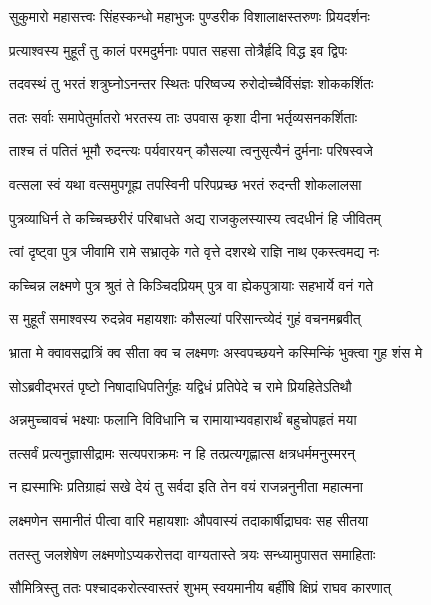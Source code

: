 \twolineshloka
{सुकुमारो महासत्त्वः सिंहस्कन्धो महाभुजः}
{पुण्डरीक विशालाक्षस्तरुणः प्रियदर्शनः} %

\twolineshloka
{प्रत्याश्वस्य मुहूर्तं तु कालं परमदुर्मनाः}
{पपात सहसा तोत्रैर्हृदि विद्ध इव द्विपः} %

\twolineshloka
{तदवस्थं तु भरतं शत्रुघ्नोऽनन्तर स्थितः}
{परिष्वज्य रुरोदोच्चैर्विसंज्ञः शोककर्शितः} %

\twolineshloka
{ततः सर्वाः समापेतुर्मातरो भरतस्य ताः}
{उपवास कृशा दीना भर्तृव्यसनकर्शिताः} %

\twolineshloka
{ताश्च तं पतितं भूमौ रुदन्त्यः पर्यवारयन्}
{कौसल्या त्वनुसृत्यैनं दुर्मनाः परिषस्वजे} %

\twolineshloka
{वत्सला स्वं यथा वत्समुपगूह्य तपस्विनी}
{परिपप्रच्छ भरतं रुदन्ती शोकलालसा} %

\twolineshloka
{पुत्रव्याधिर्न ते कच्चिच्छरीरं परिबाधते}
{अद्य राजकुलस्यास्य त्वदधीनं हि जीवितम्} %

\twolineshloka
{त्वां दृष्ट्वा पुत्र जीवामि रामे सभ्रातृके गते}
{वृत्ते दशरथे राज्ञि नाथ एकस्त्वमद्य नः} %

\twolineshloka
{कच्चिन्न लक्ष्मणे पुत्र श्रुतं ते किञ्चिदप्रियम्}
{पुत्र वा ह्येकपुत्रायाः सहभार्ये वनं गते} %

\twolineshloka
{स मुहूर्तं समाश्वस्य रुदन्नेव महायशाः}
{कौसल्यां परिसान्त्व्येदं गुहं वचनमब्रवीत्} %

\twolineshloka
{भ्राता मे क्वावसद्रात्रिं क्व सीता क्व च लक्ष्मणः}
{अस्वपच्छयने कस्मिन्किं भुक्त्वा गुह शंस मे} %

\twolineshloka
{सोऽब्रवीद्भरतं पृष्टो निषादाधिपतिर्गुहः}
{यद्विधं प्रतिपेदे च रामे प्रियहितेऽतिथौ} %

\twolineshloka
{अन्नमुच्चावचं भक्ष्याः फलानि विविधानि च}
{रामायाभ्यवहारार्थं बहुचोपहृतं मया} %

\twolineshloka
{तत्सर्वं प्रत्यनुज्ञासीद्रामः सत्यपराक्रमः}
{न हि तत्प्रत्यगृह्णात्स क्षत्रधर्ममनुस्मरन्} %

\twolineshloka
{न ह्यस्माभिः प्रतिग्राह्यं सखे देयं तु सर्वदा}
{इति तेन वयं राजन्ननुनीता महात्मना} %

\twolineshloka
{लक्ष्मणेन समानीतं पीत्वा वारि महायशाः}
{औपवास्यं तदाकार्षीद्राघवः सह सीतया} %

\twolineshloka
{ततस्तु जलशेषेण लक्ष्मणोऽप्यकरोत्तदा}
{वाग्यतास्ते त्रयः सन्ध्यामुपासत समाहिताः} %

\twolineshloka
{सौमित्रिस्तु ततः पश्चादकरोत्स्वास्तरं शुभम्}
{स्वयमानीय बर्हींषि क्षिप्रं राघव कारणात्} %

